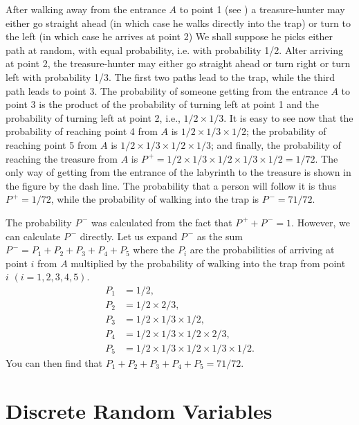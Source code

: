 After walking away from the entrance $A$ to point {1} (see ) a treasure-hunter may either go straight ahead (in
which case he walks directly into the trap) or turn to the left (in
which case he arrives at point {2}) We shall suppose he picks
either path at random, with equal probability, i.e. with probability
{1/2}. Alter arriving at point {2}, the treasure-hunter may
either go straight ahead or turn right or turn left with probability
{1/3}. The first two paths lead to the trap, while the third path
leads to point {3}. The probability of someone getting from the
entrance $A$ to point {3} is the product of the probability of
turning left at point {1} and the probability of turning left at
point {2}, i.e., $1 /2 \times 1/3$. It is easy to see now that the
probability of reaching point {4} from $A$ is
$1/2 \times 1/3 \times 1/2$; the probability of reaching point {5}
from $A$ is $1/2 \times 1/3 \times 1/2 \times 1/3$; and finally, the
probability of reaching the treasure from $A$ is
$P^{\,+} = 1/2 \times 1/3 \times 1/2 \times 1/3 \times 1/2 = 1/72$. The
only way of getting from the entrance of the labyrinth to the treasure
is shown in the figure by the dash line. The probability that a person
will follow it is thus $P^{\,+} = 1/72$, while the probability of
walking into the trap is $P^{\,-} = 71/72$.




The probability $P^{\,-}$ was calculated from the fact that $P^{\,+} +
P^{\,-} = 1$.  However, we can calculate $P^{\,-}$ directly. Let us expand
$P^{\,-}$ as the sum $P^{\,-} = P_{1} + P_{2} + P_{3} + P_{4} + P_{5}$ where the $P_{i}$ are
  the probabilities of arriving at point $i$ from $A$ multiplied by the
  probability of walking into the trap from point $i \,\, (i = 1, 2, 3, 4,
  5)$.
\begin{align*}
P_{1} & = 1/2, \\
P_{2} &= 1/2 \times 2/3, \\
P_{3} &= 1/2 \times 1/3 \times 1/2,\\
P_{4} &= 1/2 \times  1/3 \times 1/2 \times 2/3,\\
P_{5} & = 1/2 \times 1/3 \times 1/2 \times 1/3 \times 1/2.
\end{align*}
You can then find that $ P_{1} + P_{2} + P_{3} + P_{4} + P_{5} = 71/72$.

\section{Discrete Random Variables}


